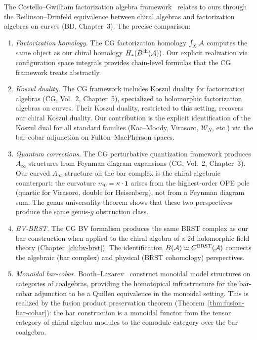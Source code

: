 \begin{remark}\label{rem:cg-comparison}
The Costello--Gwilliam factorization algebra framework~\cite{CG17}
relates to ours through the Beilinson--Drinfeld equivalence between
chiral algebras and factorization algebras on curves (BD, Chapter~3).
The precise comparison:
\begin{enumerate}[label=(\roman*)]
\item \emph{Factorization homology.}
  The CG factorization homology $\int_X \mathcal{A}$ computes the same object
  as our chiral homology $H_*(\bar{B}^{\mathrm{ch}}(\mathcal{A}))$.  Our explicit
  realization via configuration space integrals provides chain-level
  formulas that the CG framework treats abstractly.
\item \emph{Koszul duality.}
  The CG framework includes Koszul duality for factorization algebras
  (CG, Vol.~2, Chapter~5), specialized to holomorphic factorization
  algebras on curves.  Their Koszul duality, restricted to this setting,
  recovers our chiral Koszul duality.  Our contribution is the explicit
  identification of the Koszul dual for all standard families
  (Kac--Moody, Virasoro, $\mathcal{W}_N$, etc.) via the bar-cobar
  adjunction on Fulton--MacPherson spaces.
\item \emph{Quantum corrections.}
  The CG perturbative quantization framework produces $A_\infty$
  structures from Feynman diagram expansions (CG, Vol.~2, Chapter~3).
  Our curved $A_\infty$ structure on the bar complex is the
  chiral-algebraic counterpart: the curvature $m_0 = \kappa \cdot
  \mathbf{1}$ arises from the highest-order OPE pole (quartic for
  Virasoro, double for Heisenberg), not from a Feynman diagram sum.
  The genus universality theorem shows that these two perspectives
  produce the same genus-$g$ obstruction class.
\item \emph{BV-BRST.}
  The CG BV formalism produces the same BRST complex as our bar
  construction when applied to the chiral algebra of a 2d holomorphic
  field theory (Chapter~\ref{ch:bv-brst}).  The identification
  $\bar{B}(\mathcal{A}) \simeq C^{\mathrm{BRST}}(\mathcal{A})$ connects the
  algebraic (bar complex) and physical (BRST cohomology) perspectives.
\item \emph{Monoidal bar-cobar.}
  Booth--Lazarev~\cite{BL24} construct monoidal model structures on
  categories of coalgebras, providing the homotopical infrastructure
  for the bar-cobar adjunction to be a Quillen equivalence in the
  monoidal setting.  This is realized by the fusion product preservation theorem
  (Theorem~\ref{thm:fusion-bar-cobar}): the bar construction
  is a monoidal functor from the tensor category of chiral
  algebra modules to the comodule category over the bar coalgebra.
\end{enumerate}
\end{remark}

